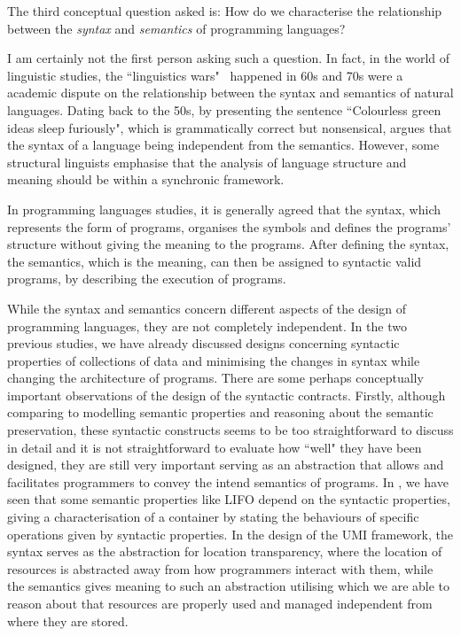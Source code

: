 \begin{center}
\vspace{-0.7em}
\vspace{-0.3em}
\end{center}

The third conceptual question asked is: 
How do we characterise the relationship between the \emph{syntax} and \emph{semantics} of programming languages?

I am certainly not the first person asking such a question. In fact, in the world of linguistic studies, the ``linguistics wars"~\citep{alma993219653502466} happened in 60s and 70s were a academic dispute on the relationship between the syntax and semantics of natural languages. Dating back to the 50s, by presenting the sentence ``Colourless green ideas sleep furiously", which is grammatically correct but nonsensical, \citet{Chomsky+1957}
argues that the syntax of a language being independent from the semantics. However, some structural linguists emphasise that the analysis of language structure and meaning should be within a synchronic framework.

In programming languages studies, it is generally agreed that the syntax, which represents the form of programs, organises the symbols and defines the programs' structure without giving the meaning to the programs. After defining the syntax, the semantics, which is the meaning, can then be assigned to syntactic valid programs, by describing the execution of programs.

While the syntax and semantics concern different aspects of the design of programming languages, they are not completely independent. In the two previous studies, we have already discussed designs concerning syntactic properties of collections of data and minimising the changes in syntax while changing the architecture of programs. There are some perhaps conceptually important observations of the design of the syntactic contracts. Firstly, although comparing to modelling semantic properties and reasoning about the semantic preservation, these syntactic constructs seems to be too straightforward to discuss in detail and it is not straightforward to evaluate how ``well" they have been designed, they are still very important serving as an abstraction that allows and facilitates programmers to convey the intend semantics of programs. In \Primrose{}, we have seen that some semantic properties like LIFO depend on the syntactic properties, giving a characterisation of a container by stating the behaviours of specific operations given by syntactic properties. In the design of the UMI framework, the syntax serves as the abstraction for location transparency, where the location of resources is abstracted away from how programmers interact with them, while the semantics gives meaning to such an abstraction utilising which we are able to reason about that resources are properly used and managed independent from where they are stored.

